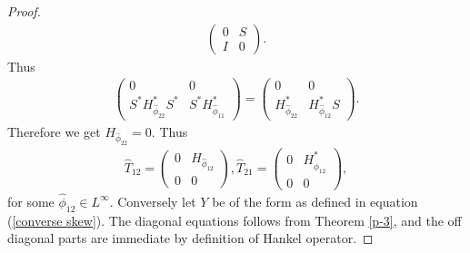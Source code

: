 \documentclass[10pt,a4paper]{amsart}
\begin{document}
\begin{proof}
\begin{align*}
\begin{pmatrix}
                    0&S\\
                    I&0
                \end{pmatrix}.
            \end{align*}
            Thus
            \begin{align*}
                \begin{pmatrix}
                    0&0\\
                    S^*H^*_{\hat{\phi}_{22}}S^*&S^*H^*_{\hat{\phi}_{11}}
                \end{pmatrix}=
                \begin{pmatrix}
                    0&0\\
                    H^*_{\hat{\phi}_{22}}&H^*_{\hat{\phi}_{12}}S
                \end{pmatrix}.
            \end{align*}
            Therefore we get $H_{\hat{\phi}_{22}}=0.$
            Thus
            \begin{align*}
                \hat{T}_{12}=
                \begin{pmatrix}
                0&H_{\hat{\phi}_{12}}\\
                0&0
                \end{pmatrix},
                \hat{T}_{21}=
                \begin{pmatrix}
                0&H^*_{\hat{\phi}_{12}}\\
                0&0
                \end{pmatrix},
            \end{align*}
            for some ${\hat{\phi}_{12}} \in L^\infty.$ Conversely let $Y$ be of the form as defined in equation (\ref{converse skew}). The diagonal equations follows from Theorem \ref{p-3}, and the off diagonal parts are immediate by definition of Hankel operator.
       \end{proof}
\end{document}

